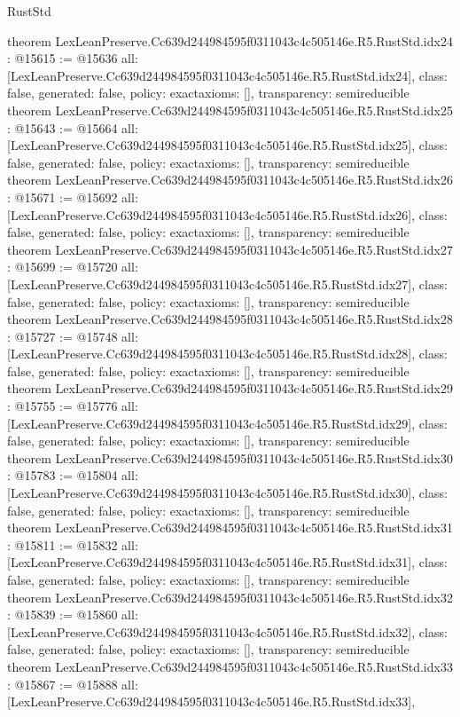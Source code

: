 \begin{lexlean}{RustStd}
\begin{coremodule}
{}
theorem LexLeanPreserve.Cc639d244984595f0311043c4c505146e.R5.RustStd.idx24 : @15615 := @15636 {
  all: [LexLeanPreserve.Cc639d244984595f0311043c4c505146e.R5.RustStd.idx24],
  class: false,
  generated: false,
  policy: exact{axioms: []},
  transparency: semireducible
}
theorem LexLeanPreserve.Cc639d244984595f0311043c4c505146e.R5.RustStd.idx25 : @15643 := @15664 {
  all: [LexLeanPreserve.Cc639d244984595f0311043c4c505146e.R5.RustStd.idx25],
  class: false,
  generated: false,
  policy: exact{axioms: []},
  transparency: semireducible
}
theorem LexLeanPreserve.Cc639d244984595f0311043c4c505146e.R5.RustStd.idx26 : @15671 := @15692 {
  all: [LexLeanPreserve.Cc639d244984595f0311043c4c505146e.R5.RustStd.idx26],
  class: false,
  generated: false,
  policy: exact{axioms: []},
  transparency: semireducible
}
theorem LexLeanPreserve.Cc639d244984595f0311043c4c505146e.R5.RustStd.idx27 : @15699 := @15720 {
  all: [LexLeanPreserve.Cc639d244984595f0311043c4c505146e.R5.RustStd.idx27],
  class: false,
  generated: false,
  policy: exact{axioms: []},
  transparency: semireducible
}
theorem LexLeanPreserve.Cc639d244984595f0311043c4c505146e.R5.RustStd.idx28 : @15727 := @15748 {
  all: [LexLeanPreserve.Cc639d244984595f0311043c4c505146e.R5.RustStd.idx28],
  class: false,
  generated: false,
  policy: exact{axioms: []},
  transparency: semireducible
}
theorem LexLeanPreserve.Cc639d244984595f0311043c4c505146e.R5.RustStd.idx29 : @15755 := @15776 {
  all: [LexLeanPreserve.Cc639d244984595f0311043c4c505146e.R5.RustStd.idx29],
  class: false,
  generated: false,
  policy: exact{axioms: []},
  transparency: semireducible
}
theorem LexLeanPreserve.Cc639d244984595f0311043c4c505146e.R5.RustStd.idx30 : @15783 := @15804 {
  all: [LexLeanPreserve.Cc639d244984595f0311043c4c505146e.R5.RustStd.idx30],
  class: false,
  generated: false,
  policy: exact{axioms: []},
  transparency: semireducible
}
theorem LexLeanPreserve.Cc639d244984595f0311043c4c505146e.R5.RustStd.idx31 : @15811 := @15832 {
  all: [LexLeanPreserve.Cc639d244984595f0311043c4c505146e.R5.RustStd.idx31],
  class: false,
  generated: false,
  policy: exact{axioms: []},
  transparency: semireducible
}
theorem LexLeanPreserve.Cc639d244984595f0311043c4c505146e.R5.RustStd.idx32 : @15839 := @15860 {
  all: [LexLeanPreserve.Cc639d244984595f0311043c4c505146e.R5.RustStd.idx32],
  class: false,
  generated: false,
  policy: exact{axioms: []},
  transparency: semireducible
}
theorem LexLeanPreserve.Cc639d244984595f0311043c4c505146e.R5.RustStd.idx33 : @15867 := @15888 {
  all: [LexLeanPreserve.Cc639d244984595f0311043c4c505146e.R5.RustStd.idx33],
}
\end{coremodule}
\end{lexlean}
